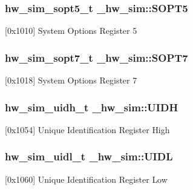 \subsubsection[{\texorpdfstring{S\+O\+P\+T5}{SOPT5}}]{ {\bf hw\+\_\+sim\+\_\+sopt5\+\_\+t} \+\_\+hw\+\_\+sim\+::\+S\+O\+P\+T5}\hypertarget{struct__hw__sim_ad21131c62f4633683ff6e912dad8a6e5}{}\label{struct__hw__sim_ad21131c62f4633683ff6e912dad8a6e5}
\mbox{[}0x1010\mbox{]} System Options Register 5 
\subsubsection[{\texorpdfstring{S\+O\+P\+T7}{SOPT7}}]{ {\bf hw\+\_\+sim\+\_\+sopt7\+\_\+t} \+\_\+hw\+\_\+sim\+::\+S\+O\+P\+T7}\hypertarget{struct__hw__sim_af6dfe82da6fc2b2d6fb8d10c48348f61}{}\label{struct__hw__sim_af6dfe82da6fc2b2d6fb8d10c48348f61}
\mbox{[}0x1018\mbox{]} System Options Register 7 
\subsubsection[{\texorpdfstring{U\+I\+DH}{UIDH}}]{ {\bf hw\+\_\+sim\+\_\+uidh\+\_\+t} \+\_\+hw\+\_\+sim\+::\+U\+I\+DH}\hypertarget{struct__hw__sim_ad95bf21ae4a65c8627c87845b51a51e0}{}\label{struct__hw__sim_ad95bf21ae4a65c8627c87845b51a51e0}
\mbox{[}0x1054\mbox{]} Unique Identification Register High 
\subsubsection[{\texorpdfstring{U\+I\+DL}{UIDL}}]{ {\bf hw\+\_\+sim\+\_\+uidl\+\_\+t} \+\_\+hw\+\_\+sim\+::\+U\+I\+DL}\hypertarget{struct__hw__sim_ac4edde90d1af8644f1f4b7cc4a3486ba}{}\label{struct__hw__sim_ac4edde90d1af8644f1f4b7cc4a3486ba}
\mbox{[}0x1060\mbox{]} Unique Identification Register Low 
